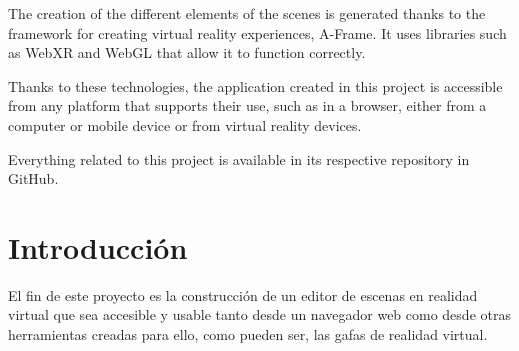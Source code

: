\documentclass[a4paper, 12pt]{book}
\begin{document}
The creation of the different elements of the scenes is generated thanks to the framework for creating virtual reality experiences, A-Frame. It uses libraries such as WebXR and WebGL that allow it to function correctly.

Thanks to these technologies, the application created in this project is accessible from any platform that supports their use, such as in a browser, either from a computer or mobile device or from virtual reality devices.

Everything related to this project is available in its respective repository in GitHub.



\tableofcontents 
\cleardoublepage
\listoffigures %




\cleardoublepage
\chapter{Introducción}
\label{sec:intro} %

El fin de este proyecto es la construcción de un editor de escenas en realidad virtual que sea accesible y usable tanto desde un navegador web como desde otras herramientas creadas para ello, como pueden ser, las gafas de realidad virtual.
\end{document}
